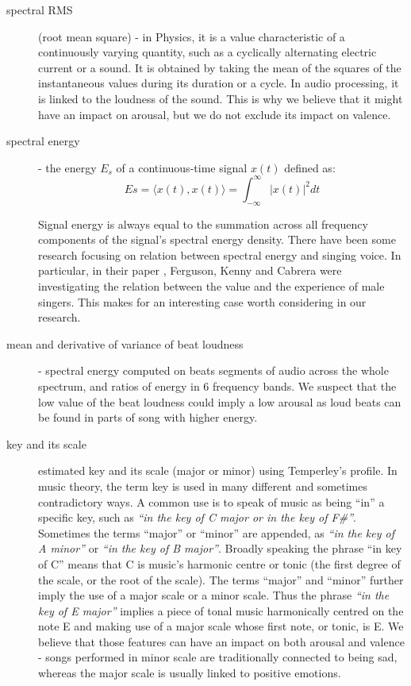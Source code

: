 \begin{description}
\item[spectral RMS] (root mean square) - in Physics, it is a value characteristic of a continuously varying quantity, such as a cyclically alternating electric current or a sound. It is obtained by taking the mean of the squares of the instantaneous values during its duration or a cycle. In audio processing, it is linked to the loudness of the sound. This is why we believe that it might have an impact on arousal, but we do not exclude its impact on valence.

\item[spectral energy] - the energy $E_{s}$ of a continuous-time signal $x(t)$ defined as: 
\begin{equation}
E{s}  =  \langle x(t), x(t)\rangle =  \int_{-\infty}^{\infty}{|x(t)|^2}dt
\end{equation}

Signal energy is always equal to the summation across all frequency components of the signal's spectral energy density. 
There have been some research focusing on relation between spectral energy and singing voice. In particular, in their paper \cite{spectralenergy}, Ferguson, Kenny and Cabrera were investigating the relation between the value and the experience of male singers. This makes for an interesting case worth considering in our research.

\item[mean and derivative of variance of beat loudness] -  spectral energy computed on beats segments of audio across the whole spectrum, and ratios of energy in 6 frequency bands. We suspect that the low value of the beat loudness could imply a low arousal as loud beats can be found in parts of song with higher energy.

\item[key and its scale] estimated key and its scale (major or minor) using Temperley’s profile. 
In music theory, the term key is used in many different and sometimes contradictory ways. A common use is to speak of music as being ``in'' a specific key, such as \textit{``in the key of C major or in the key of F\#''}. Sometimes the terms ``major'' or ``minor'' are appended, as \textit{``in the key of A minor''} or \textit{``in the key of B major''}.
Broadly speaking the phrase ``in key of C'' means that C is music's harmonic centre or tonic (the first degree of the scale, or the root of the scale). 
The terms ``major'' and ``minor'' further imply the use of a major scale or a minor scale. Thus the phrase \textit{``in the key of E major''} implies a piece of tonal music harmonically centred on the note E and making use of a major scale whose first note, or tonic, is E. 
We believe that those features can have an impact on both arousal and valence - songs performed in minor scale are traditionally connected to being sad, whereas the major scale is usually linked to positive emotions.


\end{description}
